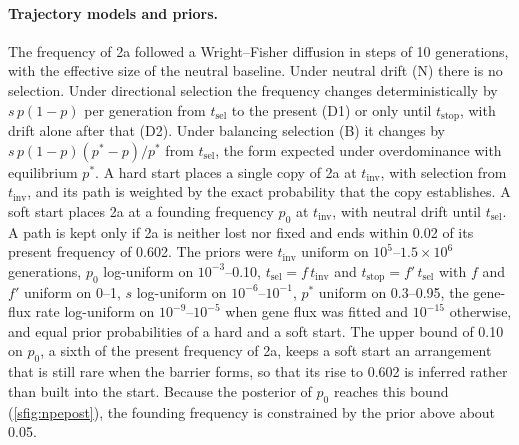 \documentclass[11pt]{article}
\begin{document}
\paragraph{Trajectory models and priors.}
The frequency of 2a followed a Wright--Fisher diffusion in steps of 10 generations, with the effective size of the neutral baseline. Under neutral drift (N) there is no selection. Under directional selection the frequency changes deterministically by $s\,p(1-p)$ per generation from $t_\mathrm{sel}$ to the present (D1) or only until $t_\mathrm{stop}$, with drift alone after that (D2). Under balancing selection (B) it changes by $s\,p(1-p)(p^{*}-p)/p^{*}$ from $t_\mathrm{sel}$, the form expected under overdominance with equilibrium $p^{*}$. A hard start places a single copy of 2a at $t_\mathrm{inv}$, with selection from $t_\mathrm{inv}$, and its path is weighted by the exact probability that the copy establishes. A soft start places 2a at a founding frequency $p_0$ at $t_\mathrm{inv}$, with neutral drift until $t_\mathrm{sel}$. A path is kept only if 2a is neither lost nor fixed and ends within 0.02 of its present frequency of 0.602. The priors were $t_\mathrm{inv}$ uniform on $10^{5}$--$1.5\times10^{6}$ generations, $p_0$ log-uniform on $10^{-3}$--0.10, $t_\mathrm{sel}=f\,t_\mathrm{inv}$ and $t_\mathrm{stop}=f'\,t_\mathrm{sel}$ with $f$ and $f'$ uniform on 0--1, $s$ log-uniform on $10^{-6}$--$10^{-1}$, $p^{*}$ uniform on 0.3--0.95, the gene-flux rate log-uniform on $10^{-9}$--$10^{-5}$ when gene flux was fitted and $10^{-15}$ otherwise, and equal prior probabilities of a hard and a soft start. The upper bound of 0.10 on $p_0$, a sixth of the present frequency of 2a, keeps a soft start an arrangement that is still rare when the barrier forms, so that its rise to 0.602 is inferred rather than built into the start. Because the posterior of $p_0$ reaches this bound (\cref{sfig:npepost}), the founding frequency is constrained by the prior above about 0.05.
\end{document}

